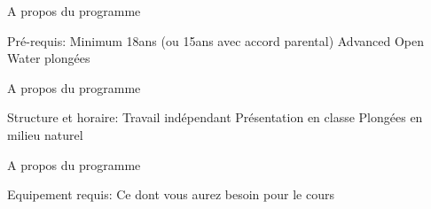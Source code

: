 \begin{frame}{A propos du programme}
	\begin{outline}
		\1 Pré-requis:
			\2 Minimum 18ans (ou 15ans avec accord parental)
			\2 Advanced Open Water
			 plongées
	\end{outline}    
\end{frame}
\begin{frame}{A propos du programme}
	\begin{outline}
		\1 Structure et horaire:
			\2 Travail indépendant
			\2 Présentation en classe
			\2 Plongées en milieu naturel
	\end{outline}    
\end{frame}
\begin{frame}{A propos du programme}
	\begin{outline}
		\1 Equipement requis:
			\2 Ce dont vous aurez besoin pour le cours
	\end{outline}    
\end{frame}